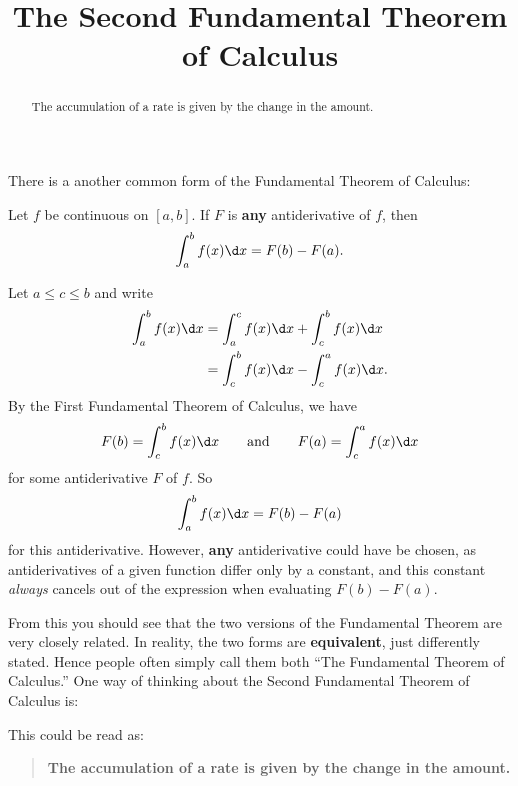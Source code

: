 \documentclass{ximera}
\title[Dig-In:]{The Second Fundamental Theorem of Calculus}
\begin{document}
\begin{abstract}
The accumulation of a rate is given by the change in the amount.
\end{abstract}
\maketitle




There is a another common form of the Fundamental Theorem of Calculus:

\begin{theorem}
  Let $f$ be continuous on $[a,b]$. If $F$ is \textbf{any}
  antiderivative of $f$, then
  \[
  \int_a^b f(x)\d x = F(b)-F(a).
  \]
  \begin{explanation}
    Let $a\le c\le b$ and write
    \begin{align*}
      \int_a^b f(x) \d x &= \int_a^c f(x) \d x + \int_c^b f(x) \d x \\
      &= \int_c^b f(x) \d x - \int_c^a f(x) \d x.
    \end{align*}
    By the First Fundamental Theorem of Calculus, we have
    \[
    F(b) = \int_c^b f(x) \d x\qquad\text{and}\qquad F(a) = \int_c^a f(x) \d x
    \] 
    for some antiderivative $F$ of $f$. So
    \[
    \int_a^b f(x) \d x = F(b)-F(a)
    \]
    for this antiderivative. However, \textbf{any} antiderivative
    could have be chosen, as antiderivatives of a given function
    differ only by a constant, and this constant \textit{always}
    cancels out of the expression when evaluating $F(b)-F(a)$.
\end{explanation}
\end{theorem}

From this you should see that the two versions of the Fundamental
Theorem are very closely related. In reality, the two forms are
\textbf{equivalent}, just differently stated. Hence people often
simply call them both ``The Fundamental Theorem of Calculus.''
One way of thinking about the Second Fundamental Theorem of Calculus is:
\begin{image}
\end{image}
This could be read as:
\begin{quote}\large\textbf{The \textcolor{green!70!black!70!blue}{accumulation} of a \textcolor{blue!70!green}{rate} is given by the \textcolor{purple!50!blue!90!black}{change in the amount}.}
\end{quote}
\end{document}
